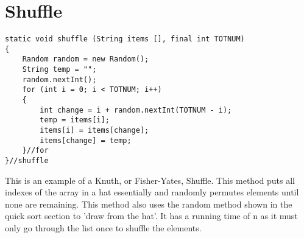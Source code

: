 \documentclass{article}
\begin{document}
\small
\section{Shuffle}
\begin{lstlisting}[frame =single,
backgroundcolor = \color{grey!12}]
static void shuffle (String items [], final int TOTNUM)
{
	Random random = new Random();
	String temp = "";
	random.nextInt();
	for (int i = 0; i < TOTNUM; i++)
	{
		int change = i + random.nextInt(TOTNUM - i);
		temp = items[i];
        items[i] = items[change];
        items[change] = temp;
	}//for
}//shuffle
\end{lstlisting}
\large
This is an example of a Knuth, or Fisher-Yates, Shuffle. This method puts all indexes of the array in a hat essentially and randomly permutes elements until none are remaining. This method also uses the random method shown in the quick sort section to 'draw from the hat'. It has a running time of n as it must only go through the list once to shuffle the elements.



\small
\end{document}
